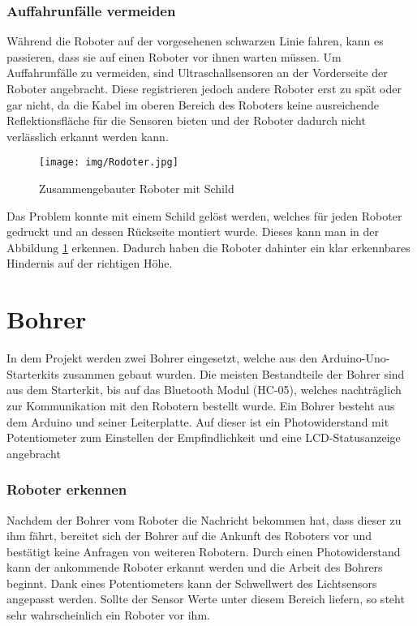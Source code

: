 \subsubsection{Auffahrunfälle vermeiden}
Während die Roboter auf der vorgesehenen schwarzen Linie fahren, kann es passieren, dass sie auf einen Roboter vor ihnen warten müssen. Um Auffahrunfälle zu vermeiden, sind Ultraschallsensoren an der Vorderseite der Roboter angebracht. Diese registrieren jedoch andere Roboter erst zu spät oder gar nicht, da die Kabel im oberen Bereich des Roboters keine ausreichende Reflektionsfläche für die Sensoren bieten und der Roboter dadurch nicht verlässlich erkannt werden kann.
\begin{figure}[h]
\begin{center}
\texttt{[image: img/Rodoter.jpg]}
\caption{Zusammengebauter Roboter mit Schild} \label{rodoter_img}
\end{center}
\end{figure}
Das Problem konnte mit einem Schild gelöst werden, welches für jeden Roboter gedruckt und an dessen Rückseite montiert wurde. Dieses kann man in der Abbildung \ref{rodoter_img} erkennen. Dadurch haben die Roboter dahinter ein klar erkennbares Hindernis auf der richtigen Höhe.

\section{Bohrer}
In dem Projekt werden zwei Bohrer eingesetzt, welche aus den Arduino-Uno-Starterkits zusammen gebaut wurden. Die meisten Bestandteile der Bohrer sind aus dem Starterkit, bis auf das Bluetooth Modul (HC-05), welches nachträglich zur Kommunikation mit den Robotern bestellt wurde. Ein Bohrer besteht aus dem Arduino und seiner Leiterplatte. Auf dieser ist ein Photowiderstand mit Potentiometer zum Einstellen der Empfindlichkeit und eine LCD-Statusanzeige angebracht

\subsubsection{Roboter erkennen}
Nachdem der Bohrer vom Roboter die Nachricht bekommen hat, dass dieser zu ihm fährt, bereitet sich der Bohrer auf die Ankunft des Roboters vor und bestätigt keine Anfragen von weiteren Robotern. Durch einen Photowiderstand kann der ankommende Roboter erkannt werden und die Arbeit des Bohrers beginnt. Dank eines Potentiometers kann der Schwellwert des Lichtsensors angepasst werden. Sollte der Sensor Werte unter diesem Bereich liefern, so steht sehr wahrscheinlich ein Roboter vor ihm.

